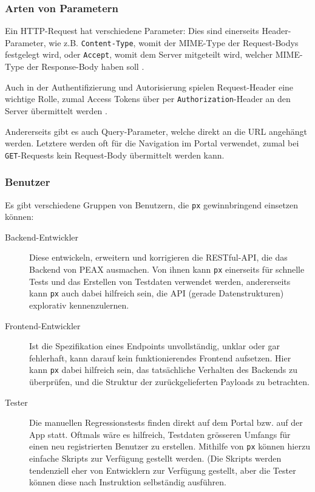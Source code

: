 \subsubsection{Arten von Parametern}

Ein HTTP-Request hat verschiedene Parameter: Dies sind einerseits Header-Parameter, wie z.B. \texttt{Content-Type}, womit der MIME-Type der Request-Bodys festgelegt wird, oder \texttt{Accept}, womit dem Server mitgeteilt wird, welcher MIME-Type der Response-Body haben soll \cite{RFC2616}.

Auch in der Authentifizierung und Autorisierung spielen Request-Header eine wichtige Rolle, zumal Access Tokens über per \texttt{Authorization}-Header an den Server übermittelt werden \cite[Kapitel 7.1]{RFC6794}.

Andererseits gibt es auch Query-Parameter, welche direkt an die URL angehängt werden. Letztere werden oft für die Navigation im Portal verwendet, zumal bei \texttt{GET}-Requests kein Request-Body übermittelt werden kann.

\subsubsection{Benutzer}
\label{sec:Benutzer}

Es gibt verschiedene Gruppen von Benutzern, die \texttt{px} gewinnbringend einsetzen können:

\begin{description}
    \item[Backend-Entwickler] Diese entwickeln, erweitern und korrigieren die RESTful-API, die das Backend von PEAX ausmachen. Von ihnen kann \texttt{px} einerseits für schnelle Tests und das Erstellen von Testdaten verwendet werden, andererseits kann \texttt{px} auch dabei hilfreich sein, die API (gerade Datenstrukturen) explorativ kennenzulernen.
    \item[Frontend-Entwickler] Ist die Spezifikation eines Endpoints unvollständig, unklar oder gar fehlerhaft, kann darauf kein funktionierendes Frontend aufsetzen. Hier kann \texttt{px} dabei hilfreich sein, das tatsächliche Verhalten des Backends zu überprüfen, und die Struktur der zurückgelieferten Payloads zu betrachten.
    \item[Tester] Die manuellen Regressionstests finden direkt auf dem Portal bzw. auf der App statt. Oftmals wäre es hilfreich, Testdaten grösseren Umfangs für einen neu registrierten Benutzer zu erstellen. Mithilfe von \texttt{px} können hierzu einfache Skripts zur Verfügung gestellt werden. (Die Skripts werden tendenziell eher von Entwicklern zur Verfügung gestellt, aber die Tester können diese nach Instruktion selbständig ausführen.
\end{description}

